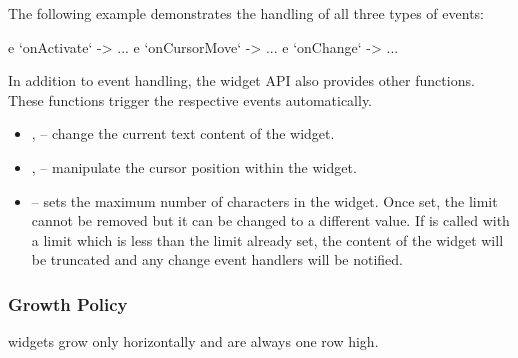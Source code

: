 The following example demonstrates the handling of all three types of
events:

\begin{haskellcode}
 e `onActivate` \this -> ...
 e `onCursorMove` \pos -> ...
 e `onChange` \newVal -> ...
\end{haskellcode}

In addition to event handling, the  widget API also provides
other functions.  These functions trigger the respective events
automatically.

\begin{itemize}
\item {},  -- change the current text
  content of the  widget.
\item {},  --
  manipulate the cursor position within the  widget.
\item {} -- sets the maximum number of characters
  in the  widget.  Once set, the limit cannot be removed but
  it can be changed to a different value.  If  is
  called with a limit which is less than the limit already set, the
  content of the  widget will be truncated and any change
  event handlers will be notified.
\end{itemize}

\subsubsection{Growth Policy}

 widgets grow only horizontally and are always one row high.
